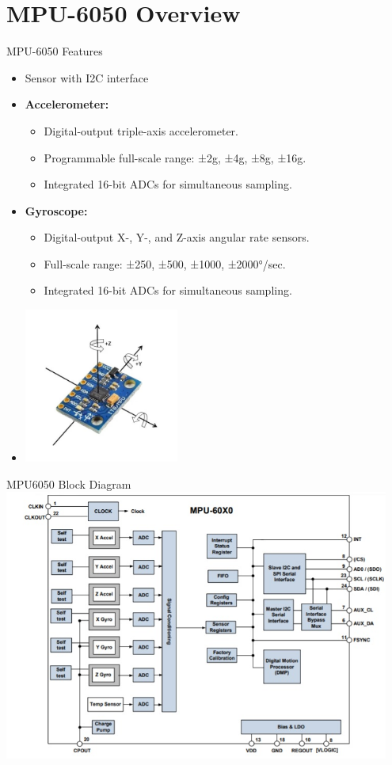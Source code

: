 \section{MPU-6050 Overview}
\begin{frame}{MPU-6050 Features}
    \begin{itemize}
        \item Sensor with I2C interface
        \item \textbf{Accelerometer:}
        \begin{itemize}
            \item Digital-output triple-axis accelerometer.
            \item Programmable full-scale range: ±2g, ±4g, ±8g, ±16g.
            \item Integrated 16-bit ADCs for simultaneous sampling.
        \end{itemize}
        \item \textbf{Gyroscope:}
        \begin{itemize}
            \item Digital-output X-, Y-, and Z-axis angular rate sensors.
            \item Full-scale range: ±250, ±500, ±1000, ±2000°/sec.
            \item Integrated 16-bit ADCs for simultaneous sampling.
        \end{itemize}
        \item \includegraphics[width=0.4\textwidth]{trainingmaterials/i2c/mpu6050.jpg}
    \end{itemize}
\end{frame}

\begin{frame}{MPU6050 Block Diagram}
    \includegraphics[width=0.95\textwidth]{trainingmaterials/i2c/Block-Diagram-of-MPU6050.jpg}
\end{frame}


